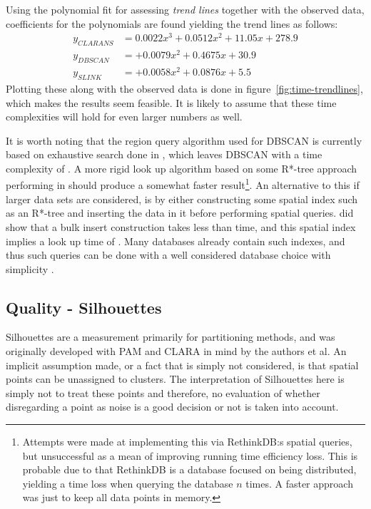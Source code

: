 Using the polynomial fit for assessing \emph{trend lines} together with the 
observed data, coefficients for the polynomials are found yielding the trend 
lines as follows:
\begin{equation}
    \label{eq:trendline-equations}
    \begin{split}
        y_{CLARANS} &= 0.0022x^3 + 0.0512 x^2 +  11.05 x + 278.9 \\
        y_{DBSCAN}  &=           + 0.0079 x^2 + 0.4675 x +  30.9 \\
        y_{SLINK}   &=           + 0.0058 x^2 + 0.0876 x +   5.5
    \end{split}
\end{equation}
Plotting these along with the observed data is done in 
figure~\ref{fig:time-trendlines}, which makes the results seem feasible. 
It is likely to assume that these time complexities will hold for even 
larger numbers as well. 

It is worth noting that the region query algorithm used for DBSCAN is 
currently based on exhaustive search done in , which leaves DBSCAN 
with a time complexity of . A more rigid look up algorithm based 
on some R*-tree approach performing in  should produce a 
somewhat faster result\footnote{
    Attempts were made at implementing this via RethinkDB:s spatial 
    queries, but unsuccessful as a mean of improving running time 
    efficiency loss. This is probable due to that RethinkDB is a database 
    focused on being distributed, yielding a time loss when querying the 
    database $n$ times. A faster approach was just to keep all data points 
    in memory. }.
An alternative to this if larger data sets are considered, is by either 
constructing some spatial index such as an R*-tree and inserting the data 
in it before performing spatial queries. \citeauthor{rtree-bulk-insert} 
did show that a bulk insert construction takes less than  
time, and this spatial index implies a look up time of . 
Many databases already contain such indexes, and thus such queries can 
be done with a well considered database choice with simplicity \cite{rtree-bulk-insert}.

\subsection{Quality - Silhouettes}
Silhouettes are a measurement primarily for partitioning methods, and was 
originally developed with PAM and CLARA in mind by the authors 
\citeauthor{silhouettes} et al. An implicit assumption made, or a fact that is 
simply not considered, is that spatial points can be unassigned to clusters. 
The interpretation of Silhouettes here is simply not to treat these points 
and therefore, no evaluation of whether disregarding a point as noise is a 
good decision or not is taken into account.


